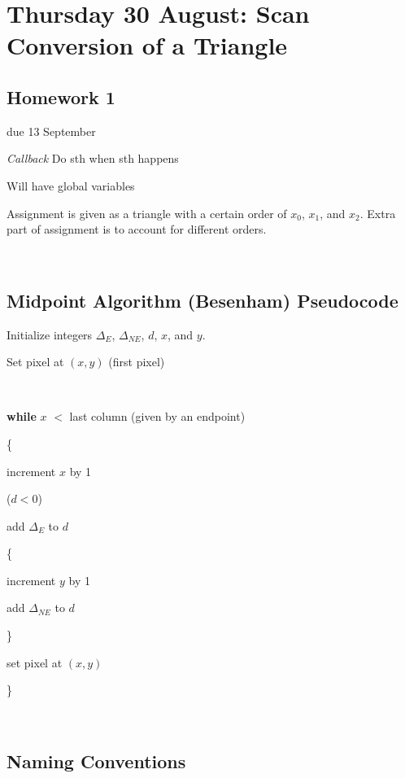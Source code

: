 \section{Thursday 30 August:  Scan Conversion of a Triangle}

\subsection{Homework 1} due 13 September

{\it Callback}  Do sth when sth happens

Will have global variables

Assignment is given as a triangle with a certain order of $x_0$, $x_1$, and $x_2$.  Extra part of assignment is to account for different orders.  

\

\subsection{Midpoint Algorithm (Besenham) Pseudocode}

Initialize integers $\Delta_E$, $\Delta_{NE}$, $d$, $x$, and $y$.  

Set pixel at $(x,y)$ (first pixel)

\

{\bf while} $x$ $<$ last column (given by an endpoint)

\{

	\qquad increment $x$ by 1
	
	 ($d<0$)
	
		\qquad \qquad add $\Delta _E$ to $d$
	
	
	\qquad \{
	
		\qquad \qquad increment $y$ by 1
		
		\qquad \qquad add $\Delta_{NE}$ to $d$
	
	\qquad \}
	
	\qquad set pixel at $(x,y)$

\}

\

\subsection{Naming Conventions}

